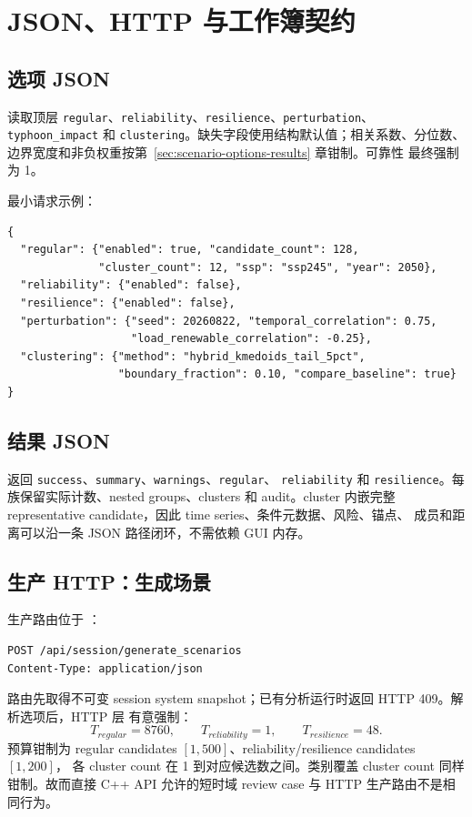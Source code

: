 \section{JSON、HTTP 与工作簿契约}
\label{sec:scenario-io-contract}

\subsection{选项 JSON}
 读取顶层
\texttt{regular}、\texttt{reliability}、\texttt{resilience}、\texttt{perturbation}、
\texttt{typhoon\_impact} 和 \texttt{clustering}。缺失字段使用结构默认值；相关系数、分位数、
边界宽度和非负权重按第~\ref{sec:scenario-options-results} 章钳制。可靠性
 最终强制为 1。

最小请求示例：
\begin{verbatim}
{
  "regular": {"enabled": true, "candidate_count": 128,
              "cluster_count": 12, "ssp": "ssp245", "year": 2050},
  "reliability": {"enabled": false},
  "resilience": {"enabled": false},
  "perturbation": {"seed": 20260822, "temporal_correlation": 0.75,
                   "load_renewable_correlation": -0.25},
  "clustering": {"method": "hybrid_kmedoids_tail_5pct",
                 "boundary_fraction": 0.10, "compare_baseline": true}
}
\end{verbatim}

\subsection{结果 JSON}
 返回
\texttt{success}、\texttt{summary}、\texttt{warnings}、\texttt{regular}、
\texttt{reliability} 和 \texttt{resilience}。每族保留实际计数、nested groups、clusters 和
audit。cluster 内嵌完整 representative candidate，因此 time series、条件元数据、风险、锚点、
成员和距离可以沿一条 JSON 路径闭环，不需依赖 GUI 内存。

\subsection{生产 HTTP：生成场景}
生产路由位于 ：
\begin{verbatim}
POST /api/session/generate_scenarios
Content-Type: application/json
\end{verbatim}
路由先取得不可变 session system snapshot；已有分析运行时返回 HTTP 409。解析选项后，HTTP 层
有意强制：
\begin{equation}
 T_{regular}=8760,\qquad T_{reliability}=1,\qquad T_{resilience}=48.
\end{equation}
预算钳制为 regular candidates $[1,500]$、reliability/resilience candidates $[1,200]$，
各 cluster count 在 1 到对应候选数之间。类别覆盖 cluster count 同样钳制。故而直接 C++ API
允许的短时域 review case 与 HTTP 生产路由不是相同行为。

